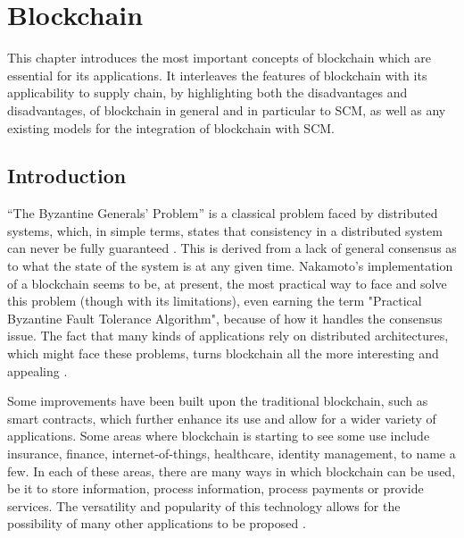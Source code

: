 \chapter{Blockchain}
\label{chap:blockchain}


This chapter introduces the most important concepts of blockchain which are essential for its applications. It interleaves the features of blockchain with its applicability to supply chain, by highlighting both the disadvantages and disadvantages, of blockchain in general and in particular to SCM, as well as any existing models for the integration of blockchain with SCM.

    \section{Introduction}
   “The Byzantine Generals' Problem” is a classical problem faced by distributed systems, which, in simple terms, states that consistency in a distributed system can never be fully guaranteed \cite{byzantine-generals-problem}. This is derived from a lack of general consensus as to what the state of the system is at any given time.
   Nakamoto's implementation of a blockchain seems to be, at present, the most practical way to face and solve  this problem (though with its limitations), even earning the term "Practical Byzantine Fault Tolerance Algorithm", because of how it handles the consensus issue. The fact that many kinds of applications rely on distributed architectures, which might face these problems, turns blockchain all the more interesting and appealing . 
   
   Some improvements have been built upon the traditional blockchain, such as smart contracts, which further enhance its use and allow for a wider variety of applications. Some areas where blockchain is starting to see some use include insurance, finance, internet-of-things, healthcare, identity management, to name a few. 
   In each of these areas, there are many ways in which blockchain can be used, be it to store information, process information, process payments or provide services. The versatility and popularity of this technology allows for the possibility of many other applications to be proposed .

